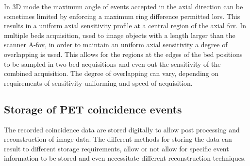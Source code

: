 %
%
In 3D mode the maximum angle of events accepted in the axial direction can be sometimes limited by enforcing a maximum ring difference permitted \glspl{lor}. This results in a uniform axial sensitivity profile at a central region of the axial \gls{fov}.
%
In multiple beds acquisition, used to image objects with a length larger than the scanner A-\gls{fov}, in order to maintain an uniform axial sensitivity a degree of overlapping is used. This allows for the regions at the edges of the bed positions to be sampled in two bed acquisitions and even out the sensitivity of the combined acquisition. The degree of overlapping can vary, depending on requirements of sensitivity uniforming and speed of acquisition.
%
\subsection{Storage of PET coincidence events}
The recorded coincidence data are stored digitally to allow post processing and reconstruction of image data.
The different methods for storing the data can result to different storage requirements, allow or not allow for specific event information to be stored and even necessitate different reconstruction techniques. 

